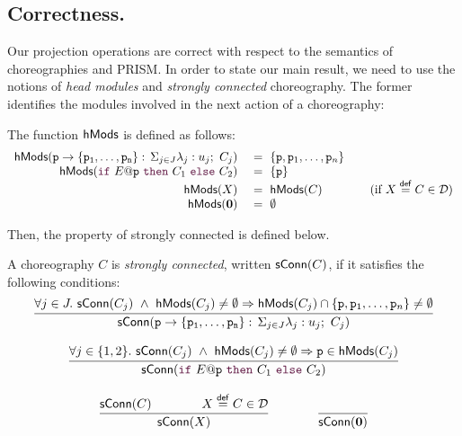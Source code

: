 \subsection{Correctness.} Our projection operations are correct with
respect to the semantics of choreographies and PRISM.
%
In order to state our main result, we need to use the notions of {\em
  head modules} and {\em strongly connected} choreography. The former
identifies the modules involved in the next action of a choreography:
\begin{definition}
  The function $\mathsf{hMods}$ is defined as follows:
  \begin{displaymath}
    \begin{array}{rll}
      \hmodules(\interact{p}{\role p_1,\ldots,\role p_n})\ & = \ \{\role p, \role p_1,\dots,\role p_n\}\\
      \hmodules(\ifTE {E}{p}{C_1}{C_2}) \ & =\ \{\role p\}\\
      \hmodules(X) \ & =\ \hmodules (C)\qquad\qquad(\text{if } X\stackrel{\mathsf{def}}{=} C\in\defin)\\
      \hmodules(\CEnd) \ & =\ \emptyset
    \end{array}
  \end{displaymath}
\end{definition}
Then, the property of strongly connected is defined below.
%
\begin{definition}
  A choreography $C$ is \emph{strongly connected}, written
  $\mathsf{sConn}(C)$, if it satisfies the following conditions:
  \begin{displaymath}
    \begin{array}{c}
      \infer {
      \sconnected(\interact{p}{\role p_1,\ldots,\role p_n})
      } {
      \forall j\in J.\ \sconnected(C_j)\ \land\ \hmodules(C_j)\neq\emptyset\Rightarrow \hmodules(C_j)\cap\{\role p, \role p_1,\dots,\role p_n\}\neq\emptyset
      }      
      
      \\\\

      \infer {
      \sconnected(\ifTE {E}{p}{C_1}{C_2})
      } {
      \forall j\in \{1,2\}.\ \sconnected(C_j)\ \land\ \hmodules(C_j)\neq\emptyset\Rightarrow \role p\in\hmodules(C_j)
      }      

      \\\\

      \infer {
      \sconnected(X)
      } {
      \sconnected(C)\qquad\qquad X\stackrel{\mathsf{def}}{=} C\in\defin
      }

      \qquad\qquad

      \infer {
      \sconnected(\CEnd)
      } {
      }

    \end{array}
  \end{displaymath}
\end{definition}
